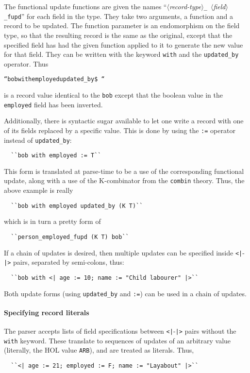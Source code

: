 The functional update functions are given the names
\mbox{``$\langle$\textsl{record-type}$\rangle$\texttt{\_}%
  $\langle$\textsl{field}$\rangle$\texttt{\_fupd}''} for each field in
the type.  They take two arguments, a function and a record to be
updated.  The function parameter is an endomorphism on the field type,
so that the resulting record is the same as the original, except that
the specified field has had the given function applied to it to
generate the new value for that field.  They can be written with the
keyword \texttt{with} and the \texttt{updated\_by} operator.  Thus
\begin{alltt}
  ``bob with employed updated_by \$~``
\end{alltt} \noindent
is a record value identical to the \texttt{bob} except that the
boolean value in the \texttt{employed} field has been inverted.

Additionally, there is syntactic sugar available to let one write a
record with one of its fields replaced by a specific value.  This is
done by using the \texttt{:=} operator instead of
\texttt{updated\_by}:
\begin{verbatim}
  ``bob with employed := T``
\end{verbatim}
This form is translated at parse-time to be a use of the corresponding
functional update, along with a use of the \textsf{K}-combinator from
the \texttt{combin} theory.  Thus, the above example  is really
\begin{verbatim}
  ``bob with employed updated_by (K T)``
\end{verbatim}
which is in turn a pretty form of
\begin{verbatim}
  ``person_employed_fupd (K T) bob``
\end{verbatim}
If a chain of updates is desired, then multiple updates can be
specified inside \texttt{<|}-\texttt{|>} pairs, separated by
semi-colons, thus:

\begin{verbatim}
  ``bob with <| age := 10; name := "Child labourer" |>``
\end{verbatim}
Both update forms (using \texttt{updated\_by} and \texttt{:=}) can be
used in a chain of updates.

\paragraph{Specifying record literals}

The parser accepts lists of field specifications between
\texttt{<|}-\texttt{|>} pairs without the \texttt{with} keyword.
These translate to sequences of updates of an arbitrary value
(literally, the HOL value \texttt{ARB}), and are treated as literals.
Thus,
\begin{verbatim}
  ``<| age := 21; employed := F; name := "Layabout" |>``
\end{verbatim}

